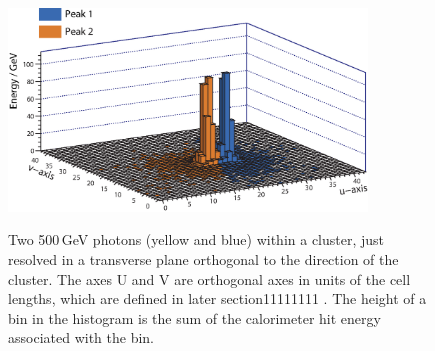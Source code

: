 


\begin{figure}[tbph]
\centering
{\includegraphics[width=0.85\textwidth]{photon/peakFindingMod}}
\caption[Example of projecting a large photon cluster containing two photons.]
{Two 500\,GeV photons (yellow and blue) within a  cluster, just resolved in a transverse plane orthogonal to the direction of the cluster.  The axes U and V are orthogonal axes in units of the \ECAL cell lengths, which are defined in later section11111111    . The height of a bin in the histogram is the sum of the calorimeter hit energy associated with the bin.}
\label{fig:photonPeakFinding}
\end{figure}


